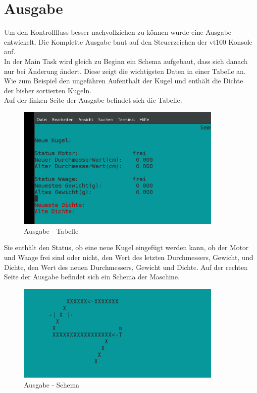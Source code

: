 \section{Ausgabe}
Um den Kontrollfluss besser nachvollziehen zu können wurde eine Ausgabe entwickelt.
Die Komplette Ausgabe baut auf den Steuerzeichen der vt100 Konsole auf.\\
In der Main Task wird gleich zu Beginn ein Schema aufgebaut, dass sich danach nur bei Änderung ändert.
Diese zeigt die wichtigsten Daten in einer Tabelle an.\\
Wie zum Beispiel den ungefähren Aufenthalt der Kugel und enthält die Dichte der bisher sortierten Kugeln.\\
Auf der linken Seite der Ausgabe befindet sich die Tabelle.\\
\begin{figure}[h]
\begin{center}
\includegraphics[width=10cm]{grafiken/Ausgabe_tabelle.png}
\caption{Ausgabe - Tabelle}
\label{Ausgabe}
\end{center}
\end{figure}
Sie enthält den Status, ob eine neue Kugel eingefügt werden kann, ob der Motor und Waage frei sind oder nicht, den Wert des letzten Durchmessers, Gewicht, und Dichte, den Wert des neuen Durchmessers, Gewicht und Dichte.
\newpage
\noindent
Auf der rechten Seite der Ausgabe befindet sich ein Schema der Maschine.
\begin{figure}[h]
\begin{center}
\includegraphics[width=10cm]{grafiken/Ausgabe_Schema.png}
\caption{Ausgabe - Schema}
\label{Ausgabe}
\end{center}
\end{figure}
